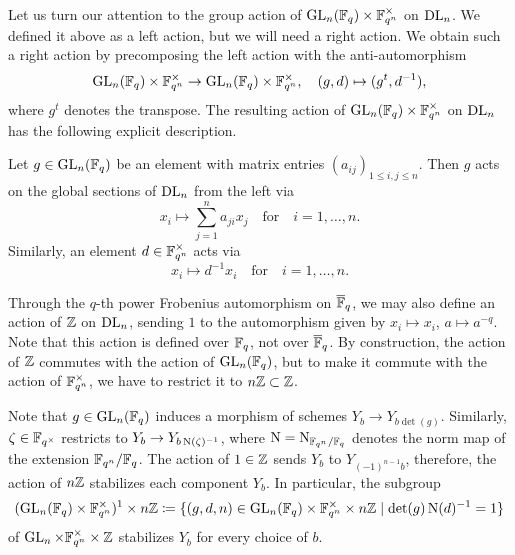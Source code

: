 \documentclass[../main.tex]{subfiles}
\begin{document}
Let us turn our attention to the group action of 
$\operatorname{GL}_n(\mathbb{F}_q) \times \mathbb{F}_{q^n}^\times$ on $\mathrm{DL}_n$. 
We defined it above as a left action, but we will need a
right action. We obtain such a right action by 
precomposing the left action with the anti-automorphism
\begin{equation*}
    \operatorname{GL}_n(\mathbb{F}_q) \times \mathbb{F}_{q^n}^\times \to 
    \operatorname{GL}_n(\mathbb{F}_q) \times \mathbb{F}_{q^n}^\times,
    \quad
    (g, d) \mapsto (g^t, d^{-1}),
\end{equation*}
where $g^t$ denotes the transpose.
The resulting action of $\operatorname{GL}_n(\mathbb{F}_q) \times \mathbb{F}_{q^n}^\times$ on $\mathrm{DL}_n$ has the following
explicit description.
\begin{lem}\label{lem:ActionsOnDLn}
  Let $g \in \operatorname{GL}_n(\mathbb{F}_q)$ be an element with matrix entries $(a_{ij})_{1 \leq
  i,j \leq n}$. Then $g$ acts on the global sections of $\mathrm{DL}_n$ from the left via
  \begin{equation*}
    x_i  \mapsto  \sum_{j = 1}^n a_{ji}x_j \quad \text{for} \quad i = 1, \dots, n. 
  \end{equation*}
  Similarly, an element $d \in \mathbb{F}_{q^n}^\times$ acts via
  \begin{equation*}
    x_i \mapsto d^{-1} x_i \quad \text{for} \quad i = 1, \dots, n.
  \end{equation*}
\end{lem}

Through the $q$-th power Frobenius automorphism on $\overline {\mathbb{F}}_q$, we may also
define an action of $\mathbb{Z}$ on $\mathrm{DL}_n$, sending $1$ to the automorphism given by
$x_i \mapsto x_i$, $a \mapsto a^{-q}$. Note that this action is defined over
$\mathbb{F}_q$, not over $\overline {\mathbb{F}}_q$. 
By construction, the action of $\mathbb{Z}$ commutes with the action of $\operatorname{GL}_n(\mathbb{F}_q)$, but to make it commute with the action of $\mathbb{F}_{q^n}^\times$, we 
have to restrict it to $n\mathbb{Z} \subset \mathbb{Z}$. 

Note that $g \in \operatorname{GL}_n(\mathbb{F}_q)$ induces a morphism of schemes
$Y_b \to Y_{b \det(g)}$. Similarly, $\zeta \in \mathbb{F}_{q^\times}$ 
restricts to $Y_b \to Y_{b \operatorname{N}(\zeta)^{-1}}$, where $\operatorname{N} = \operatorname{N}_{\mathbb{F}_{q^n}/\mathbb{F}_q}$
denotes the norm map of the extension $\mathbb{F}_{q^n}/\mathbb{F}_q$. The action of 
$1 \in \mathbb{Z}$ sends $Y_b$ to $Y_{(-1)^{n-1} b}$, therefore, the action of 
$n\mathbb{Z}$ stabilizes each component $Y_b$. In particular, 
the subgroup 
\begin{equation*}
  (\operatorname{GL}_n(\mathbb{F}_q) \times \mathbb{F}_{q^n}^\times)^1 \times n\mathbb{Z} 
  \coloneq \{(g,d,n) \in \operatorname{GL}_n(\mathbb{F}_q) \times \mathbb{F}_{q^n}^\times \times n\mathbb{Z} 
  \mid \det(g) \operatorname{N}(d)^{-1} = 1\}
\end{equation*}
of $\operatorname{GL}_n \times \mathbb{F}_{q^n}^\times \times \mathbb{Z}$
stabilizes $Y_b$ for every choice of $b$.
\end{document}
